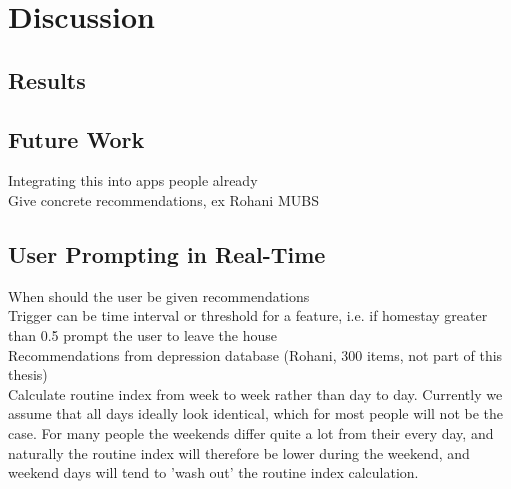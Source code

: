\chapter{Discussion}
\label{chapter:07}






\section{Results}

\section{Future Work}
Integrating this into apps people already\\
Give concrete recommendations, ex Rohani MUBS\\

\section{User Prompting in Real-Time}
When should the user be given recommendations\\
Trigger can be time interval or threshold for a feature, i.e. if homestay greater than 0.5 prompt the user to leave the house\\
Recommendations from depression database (Rohani, 300 items, not part of this thesis)\\

Calculate routine index from week to week rather than day to day. Currently we assume that all days ideally look identical, which for most people will not be the case. For many people the weekends differ quite a lot from their every day, and naturally the routine index will therefore be lower during the weekend, and weekend days will tend to 'wash out' the routine index calculation. 
